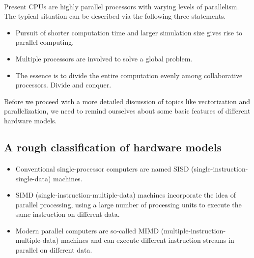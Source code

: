 \documentclass[%
oneside,                 %
final,                   %
10pt]{article}
\begin{document}
\paragraph{}
Present CPUs are highly parallel processors with varying levels of parallelism. The typical situation can be described via the following three statements.
\begin{itemize}
\item Pursuit of shorter computation time and larger simulation size gives rise to parallel computing.

\item Multiple processors are involved to solve a global problem.

\item The essence is to divide the entire computation evenly among collaborative processors.  Divide and conquer.
\end{itemize}

\noindent
Before we proceed with a more detailed discussion of topics like vectorization and parallelization, we need to remind ourselves about some basic features of different hardware models.



\subsection*{A rough classification of hardware models}

\paragraph{}

\begin{itemize}
\item Conventional single-processor computers are named SISD (single-instruction-single-data) machines.

\item SIMD (single-instruction-multiple-data) machines incorporate the idea of parallel processing, using a large number of processing units to execute the same instruction on different data.

\item Modern parallel computers are so-called MIMD (multiple-instruction-multiple-data) machines and can execute different instruction streams in parallel on different data.
\end{itemize}
\end{document}
